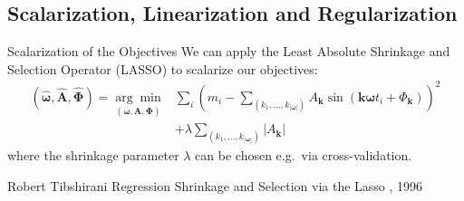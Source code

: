 \documentclass{beamer}
\begin{document}

\subsection{Scalarization, Linearization and Regularization}
\begin{frame}{Scalarization of the Objectives}
We can apply the Least Absolute Shrinkage and Selection Operator (LASSO) to scalarize our objectives:
\begin{align*}(\boldsymbol{\hat \omega}, \mathbf {\hat A}, \boldsymbol{\hat \Phi})
  = \underset{(\boldsymbol \omega, \mathbf A, \boldsymbol \Phi)}{\arg\min}
  & \sum_i \left(m_i - \sum_{(k_1, \dots, k_{|\boldsymbol{\omega}|})} A_{\mathbf{k}} \sin \left(\mathbf{k} \boldsymbol{\omega} t_i + \Phi_{\mathbf{k}} \right) \right)^2
\\&+ \lambda \sum_{(k_1, \dots, k_{|\boldsymbol{\omega}|})} |A_{\mathbf{k}}|
\end{align*}
where the shrinkage parameter $\lambda$ can be chosen e.g.~via cross-validation. 
\vspace{3mm}
\begin{thebibliography}{1}
  \beamertemplatearticlebibitems
    Robert Tibshirani
    \newblock Regression Shrinkage and Selection via the Lasso
    , 1996
    \end{thebibliography}
\end{frame}
\end{document}
